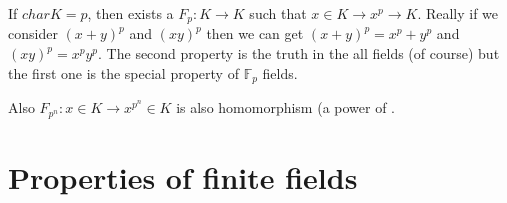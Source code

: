 \begin{remark}
  If $char K = p$, then exists a 
  $F_p: K \to K$ such that $x \in K \to x^p \to K$.
  Really if we consider $\left(x+y\right)^p$ and $\left(xy\right)^p$
  then we can get $\left(x+y\right)^p = x^p + y^p$ and
  $\left(xy\right)^p = x^p y^p$. The second property is the truth in
  the all fields (of course) but the first one is the special property
  of $\mathbb{F}_p$ fields.
  \label{rem:frobeniushomomorphism}
\end{remark}

\begin{remark}
  Also $F_{p^n} : x \in K \to x^{p^n} \in K$ is also homomorphism (a
  power of .
  \label{rem:frobeniuspowerhomomorphism}
\end{remark}

\section{Properties of finite fields}

